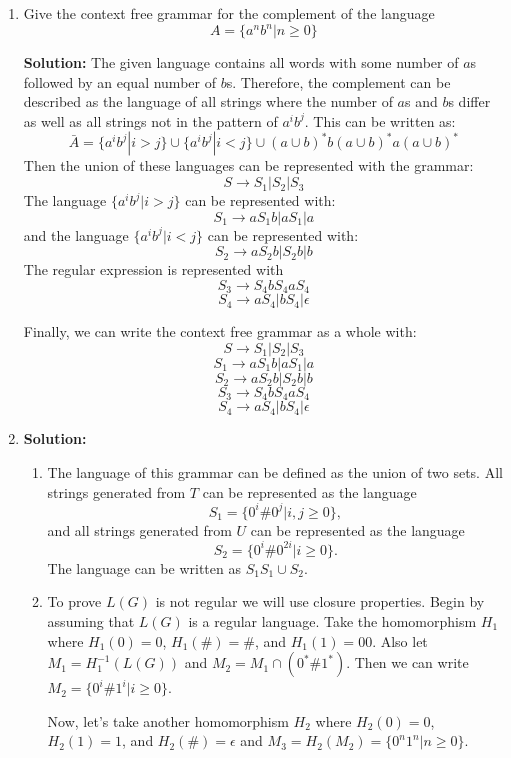 \documentclass[11pt]{article}
\begin{document}
\begin{enumerate}
\item %
Give the context free grammar for the complement of the language
$$ A = \{ a^nb^n | n \geq 0 \} $$

\textbf{Solution: }
The given language contains all words with some number of $a$s followed by an equal number of $b$s.  Therefore, the complement can be described as the language of all strings where the number of $a$s and $b$s differ as well as all strings not in the pattern of $a^ib^j$.  This can be written as:
$$ \bar{A} = \{ a^ib^j | i > j \} \cup \{ a^ib^j | i < j \} \cup (a \cup b)^*b(a \cup b)^*a(a \cup b)^* $$
Then the union of these languages can be represented with the grammar:
$$ S \rightarrow S_1 | S_2 | S_3 $$
The language $\{ a^ib^j | i > j \}$ can be represented with:
$$ S_1 \rightarrow aS_1b | aS_1 | a $$
and the language $\{ a^ib^j | i < j \}$ can be represented with:
$$ S_2 \rightarrow aS_2b | S_2b | b $$
The regular expression is represented with 
$$ S_3 \rightarrow S_4bS_4aS_4 $$
$$ S_4 \rightarrow aS_4 | bS_4 | \epsilon $$

Finally, we can write the context free grammar as a whole with:
$$ S \rightarrow S_1 | S_2 | S_3 $$
$$ S_1 \rightarrow aS_1b | aS_1 | a $$
$$ S_2 \rightarrow aS_2b | S_2b | b $$
$$ S_3 \rightarrow S_4bS_4aS_4 $$
$$ S_4 \rightarrow aS_4 | bS_4 | \epsilon $$


\item %

\textbf{Solution:}
\begin{enumerate}

\item
The language of this grammar can be defined as the union of two sets.  All strings generated from $T$ can be represented as the language
$$ S_1 = \{ 0^i\#0^j | i,j \geq 0 \}, $$
and all strings generated from $U$ can be represented as the language
$$ S_2 = \{ 0^i\#0^{2i} | i \geq 0 \} .$$
The language can be written as $S_1S_1 \cup S_2$.  

\item
To prove $L(G)$ is not regular we will use closure properties.  Begin by assuming that $L(G)$ is a regular language.  Take the homomorphism $H_1$ where $H_1(0) = 0$, $H_1(\#) = \#$, and $H_1(1) = 00$.  Also let $M_1 = H_1^{-1}(L(G))$ and $M_2 = M_1 \cap (0^*\#1^*)$.  Then we can write $M_2 = \{ 0^i\#1^i | i \geq 0 \}$.  

Now, let's take another homomorphism $H_2$ where $H_2(0) = 0$, $H_2(1) = 1$, and $H_2(\#) = \epsilon$ and $M_3 = H_2(M_2) = \{ 0^n1^n | n \geq 0 \}$.  


\end{enumerate}
\end{enumerate}
\end{document}
